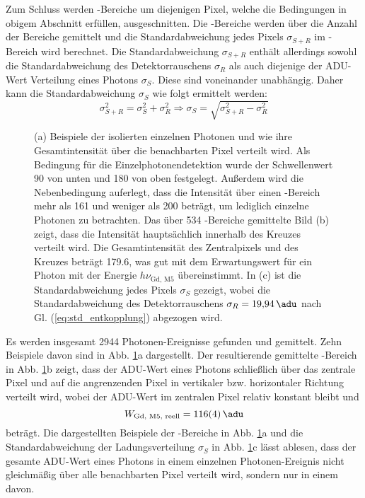 \noindent
Zum Schluss werden -Bereiche um diejenigen Pixel, welche die Bedingungen in obigem Abschnitt erfüllen, ausgeschnitten. Die -Bereiche werden über die Anzahl der Bereiche gemittelt und die Standardabweichung jedes Pixels $\sigma_{S+R}$ im -Bereich wird berechnet. Die Standardabweichung $\sigma_{S+R}$ enthält allerdings sowohl die Standardabweichung des Detektorrauschens $\sigma_{R}$ als auch diejenige der ADU-Wert Verteilung eines Photons $\sigma_{S}$. Diese sind voneinander unabhängig. Daher kann die Standardabweichung $\sigma_{S}$ wie folgt ermittelt werden:
\begin{equation}
    \sigma_{S+R}^2 = \sigma_{S}^2 + \sigma_{R}^2 \Rightarrow \sigma_{S} = \sqrt{\sigma_{S+R}^2 - \sigma_{R}^2}
    \label{eq:std_entkopplung}
\end{equation}
\begin{figure}[H]
    \centering
    
    \caption{(a) Beispiele der isolierten einzelnen Photonen und wie ihre Gesamtintensität über die benachbarten Pixel verteilt wird. Als Bedingung für die Einzelphotonendetektion wurde der Schwellenwert \SI{90}{\adu} von unten und \SI{180}{\adu} von oben festgelegt. Außerdem wird die Nebenbedingung auferlegt, dass die Intensität über einen -Bereich mehr als \SI{161}{\adu} und weniger als \SI{200}{\adu} beträgt, um lediglich einzelne Photonen zu betrachten. Das über 534 -Bereiche gemittelte Bild (b) zeigt, dass die Intensität hauptsächlich innerhalb des Kreuzes verteilt wird. Die Gesamtintensität des Zentralpixels und des Kreuzes beträgt \SI{179.6}{\adu}, was gut mit dem Erwartungswert für ein Photon mit der Energie $h\nu_\text{Gd, M5}$ übereinstimmt. In (c) ist die Standardabweichung jedes Pixels $\sigma_{S}$ gezeigt, wobei die Standardabweichung des Detektorrauschens $\sigma_R = \SI{19.94}{\adu}$ nach Gl. (\ref{eq:std_entkopplung}) abgezogen wird.}
    \label{fig:examples_average_std_5x5_hotspot}
\end{figure}
\noindent
Es werden insgesamt 2944 Photonen-Ereignisse gefunden und gemittelt. Zehn Beispiele davon sind in Abb. \ref{fig:examples_average_std_5x5_hotspot}a dargestellt. Der resultierende gemittelte -Bereich in Abb. \ref{fig:examples_average_std_5x5_hotspot}b zeigt, dass der ADU-Wert eines Photons schließlich über das zentrale Pixel und auf die angrenzenden Pixel in vertikaler bzw. horizontaler Richtung verteilt wird, wobei der ADU-Wert im zentralen Pixel relativ konstant bleibt und 
\begin{equation}
    W_\text{Gd, M5, reell}  = \SI{116(4)}{\adu} 
\end{equation}
beträgt. Die dargestellten Beispiele der -Bereiche in Abb. \ref{fig:examples_average_std_5x5_hotspot}a und die Standardabweichung der Ladungsverteilung $\sigma_{S}$ in Abb. \ref{fig:examples_average_std_5x5_hotspot}c lässt ablesen, dass der gesamte ADU-Wert eines Photons in einem einzelnen Photonen-Ereignis nicht gleichmäßig über alle benachbarten Pixel verteilt wird, sondern nur in einem davon. 

